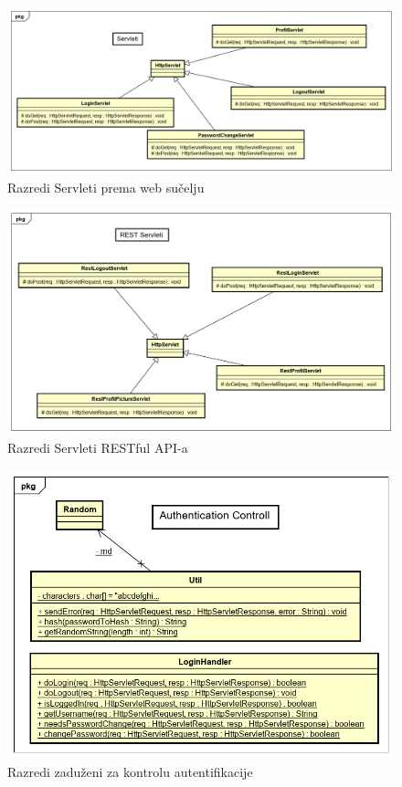 			\begin{figure}[H]
				\includegraphics[scale=0.5]{Slike/Class Diagram6.PNG}
				\centering
				\caption{Razredi Servleti prema web sučelju}
				\label{fig:dijagram}
			\end{figure}
		
			\begin{figure}[H]
				\includegraphics[scale=0.54]{Slike/Class Diagram7.PNG}
				\centering
				\caption{Razredi Servleti RESTful API-a}
				\label{fig:dijagram}
			\end{figure}
		
			\begin{figure}[H]
				\includegraphics[scale=0.65]{Slike/Class Diagram8.PNG}
				\centering
				\caption{Razredi zaduženi za kontrolu autentifikacije}
				\label{fig:dijagram}
			\end{figure}
		
